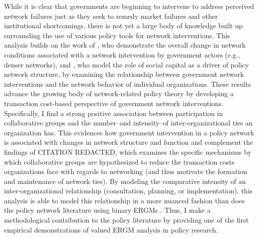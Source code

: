 \documentclass[12pt,a4paper,titlepage]{article}
\begin{document}
While it is clear that governments are beginning to intervene to address perceived network failures just as they seek to remedy market failures and other institutional shortcomings, there is not yet a large body of knowledge built up surrounding the use of various policy tools for network interventions. This analysis builds on the work of \textcite{schneider2003}, who demonstrate the overall change in network conditions associated with a network intervention by government actors (e.g., denser networks), and \textcite{henry2011}, who model the role of social capital as a driver of policy network structure, by examining the relationship between government network interventions and the network behavior of individual organizations.  These results advance the growing body of network-related policy theory by developing a transaction cost-based perspective of government network interventions. Specifically, I find a strong positive association between participation in collaborative groups and the number--and intensity--of inter-organizational ties an organization has. This evidences how government intervention in a policy network is associated with changes in network structure and function and complement the findings of CITATION REDACTED, which examines the specific mechanisms by which collaborative groups are hypothesized to reduce the transaction costs organizations face with regards to networking (and thus motivate the formation and maintenance of network ties). By modeling the comparative intensity of an inter-organizational relationship (consultation, planning, or implementation), this analysis is able to model this relationship in a more nuanced fashion than does the policy network literature using binary ERGMs \parencite[e.g.,][]{lubell2012, gerber2013, schneider2003}. Thus, I make a methodological contribution to the policy literature by providing one of the first empirical demonstrations of valued ERGM analysis in policy research.
\end{document}
